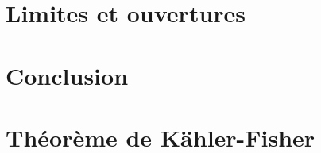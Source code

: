 \documentclass[11pt, a4paper]{article}
\numberwithin{equation}{section}
\begin{document}
\section{Limites et ouvertures}
\label{sec:limites}


\section{Conclusion}
\label{sec:conclusion}


\appendix

\section{Théorème de Kähler-Fisher}
\label{app:kahler-fisher}

\end{document}
